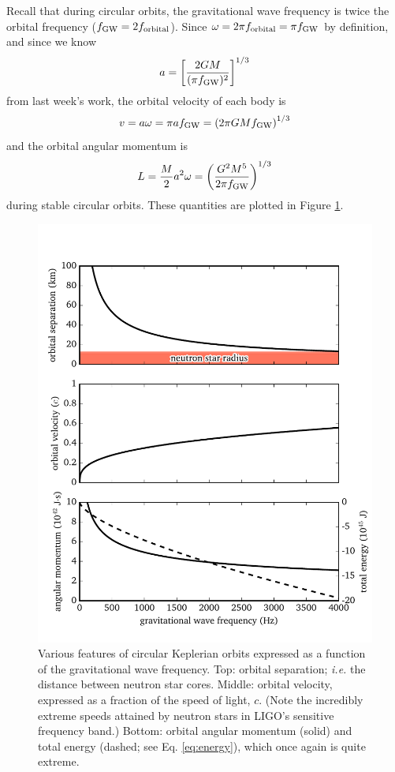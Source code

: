 \documentclass[11pt]{article}
\begin{document}
\begin{enumerate}
\hspace{15pt} Recall that during circular orbits, the gravitational wave frequency is twice the orbital frequency ($f_{\rm GW} = 2f_{\rm orbital}$). Since $\omega = 2\pi f_{\rm orbital} = \pi f_{\rm GW}$ by definition, and since we know
\begin{equation}
a = \left[ \frac{2GM}{(\pi f_{\rm GW})^2} \right]^{1/3}
\end{equation}
from last week's work, the orbital velocity of each body is
\begin{equation}
v = a\omega = \pi a f_{\rm GW} = \left( 2\pi GMf_{\rm GW} \right)^{1/3}
\end{equation}
and the orbital angular momentum is
\begin{equation}
L = \frac{M}{2} a^2 \omega = \left( \frac{G^2M^{5}}{2\pi f_{\rm GW}} \right)^{1/3}
\end{equation}
during stable circular orbits. These quantities are plotted in Figure \ref{fig:L}.

\begin{figure}
\centering
\includegraphics[scale=1]{stable_orbit/kepler_angular_momentum.pdf}
\caption{\label{fig:L} Various features of circular Keplerian orbits expressed as a function of the gravitational wave frequency. Top: orbital separation; \textit{i.e.} the distance between neutron star cores. Middle: orbital velocity, expressed as a fraction of the speed of light, $c$. (Note the incredibly extreme speeds attained by neutron stars in LIGO's sensitive frequency band.) Bottom: orbital angular momentum (solid) and total energy (dashed; see Eq. \ref{eq:energy}), which once again is quite extreme.}
\end{figure}


\end{enumerate}
\end{document}
